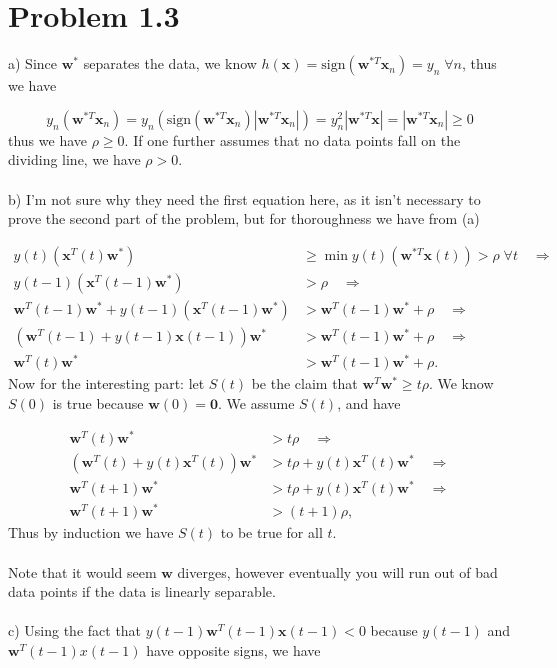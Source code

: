 \documentclass[11pt,letterpaper]{article}
\newcommand{\sign}[0]{\textrm{sign}}
\newcommand{\vv}[1]{\mathbf{#1}} %
\begin{document}
\section*{Problem 1.3}

a) Since $\vv{w}^*$ separates the data, we know $h(\vv{x}) = \sign(\vv{w}^{*T}\vv{x}_n) = y_n \; \forall n$, thus we have

\begin{equation*}
    y_n(\vv{w}^{*T}\vv{x}_n) = y_n(\sign(\vv{w}^{*T}\vv{x}_n)|\vv{w}^{*T}\vv{x}_n|) = y_n^2 |\vv{w}^{*T}\vv{x}| = |\vv{w}^{*T}\vv{x}_n| \ge 0
\end{equation*}
thus we have $\rho \ge 0$.  If one further assumes that no data points fall on the dividing line, we have $\rho > 0$.
\\\\
b) I'm not sure why they need the first equation here, as it isn't necessary to prove the second part of the problem, but for thoroughness we have from (a)

\begin{align*}
     y(t)(\vv{x}^T(t)\vv{w}^*) &\ge \min y(t)(\vv{w}^{*T}\vv{x}(t)) > \rho \; \forall t \quad \Longrightarrow \\
     y(t - 1)(\vv{x}^T(t - 1)\vv{w}^*) &> \rho \quad \Longrightarrow \\
     \vv{w}^T(t - 1)\vv{w}^*  + y(t - 1)(\vv{x}^T(t - 1)\vv{w}^*) &> \vv{w}^T(t - 1)\vv{w}^* + \rho \quad \Longrightarrow \\
     (\vv{w}^T(t - 1) + y(t - 1)\vv{x}(t - 1))\vv{w}^* &> \vv{w}^T(t - 1)\vv{w}^* + \rho \quad \Longrightarrow \\
     \vv{w}^T(t)\vv{w}^* &> \vv{w}^T(t - 1)\vv{w}^* + \rho.
\end{align*}
Now for the interesting part: let $S(t)$ be the claim that $\vv{w}^T\vv{w}^* \ge t\rho$.  We know $S(0)$ is true because $\vv{w}(0) = \vv{0}$.  We assume $S(t)$, and have

\begin{align*}
 \vv{w}^T(t)\vv{w}^* &> t\rho \quad \Longrightarrow \\
 (\vv{w}^T(t) + y(t)\vv{x}^T(t))\vv{w}^* &> t\rho +  y(t)\vv{x}^T(t)\vv{w}^* \quad \Longrightarrow \\
 \vv{w}^T(t + 1)\vv{w}^* &> t\rho +  y(t)\vv{x}^T(t)\vv{w}^* \quad \Longrightarrow \\
 \vv{w}^T(t + 1)\vv{w}^* &> (t + 1)\rho,
\end{align*}
Thus by induction we have $S(t)$ to be true for all $t$.
\\\\
Note that it would seem $\vv{w}$ diverges, however eventually you will run out of bad data points if the data is linearly separable.
\\\\
c) Using the fact that $y(t-1)\vv{w}^T(t - 1)\vv{x}(t-1) < 0$ because $y(t-1)$ and $\vv{w}^T(t-1){x}(t-1)$ have opposite signs, we have
\end{document}
